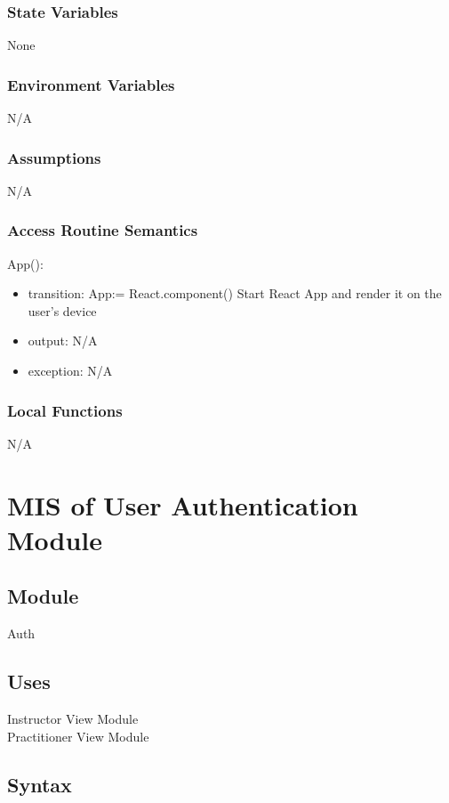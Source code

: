 \documentclass[12pt, titlepage]{article}
\begin{document}
\subsubsection{State Variables}
None

\subsubsection{Environment Variables}
N/A

\subsubsection{Assumptions}
N/A

\subsubsection{Access Routine Semantics}

\noindent App():
\begin{itemize}
  \item transition: App:= React.component() Start React App and render it on the user's device
  \item output: N/A
  \item exception: N/A
\end{itemize}

\subsubsection{Local Functions}
N/A

\section{MIS of User Authentication Module}
\label{sec:userauth}

\subsection{Module}
Auth

\subsection{Uses}
Instructor View Module\\
Practitioner View Module

\subsection{Syntax}
\end{document}
